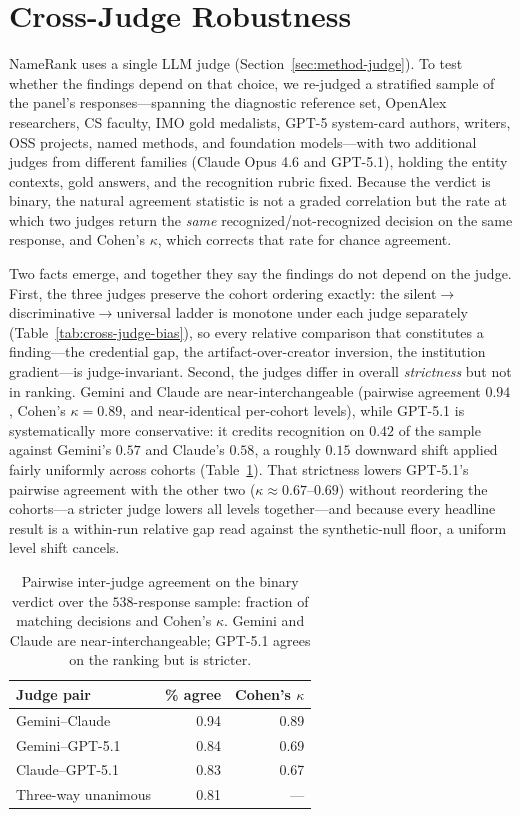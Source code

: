\section{Cross-Judge Robustness}
\label{app:cross-judge}

NameRank uses a single LLM judge (Section~\ref{sec:method-judge}). To test whether the findings depend on that choice, we re-judged a stratified sample of the panel's responses---spanning the diagnostic reference set, OpenAlex researchers, CS faculty, IMO gold medalists, GPT-5 system-card authors, writers, OSS projects, named methods, and foundation models---with two additional judges from different families (Claude Opus 4.6 and GPT-5.1), holding the entity contexts, gold answers, and the recognition rubric fixed. Because the verdict is binary, the natural agreement statistic is not a graded correlation but the rate at which two judges return the \emph{same} recognized/not-recognized decision on the same response, and Cohen's $\kappa$, which corrects that rate for chance agreement.

Two facts emerge, and together they say the findings do not depend on the judge. First, the three judges preserve the cohort ordering exactly: the silent$\to$discriminative$\to$universal ladder is monotone under each judge separately (Table~\ref{tab:cross-judge-bias}), so every relative comparison that constitutes a finding---the credential gap, the artifact-over-creator inversion, the institution gradient---is judge-invariant. Second, the judges differ in overall \emph{strictness} but not in ranking. Gemini and Claude are near-interchangeable (pairwise agreement $0.94$, Cohen's $\kappa=0.89$, and near-identical per-cohort levels), while GPT-5.1 is systematically more conservative: it credits recognition on $0.42$ of the sample against Gemini's $0.57$ and Claude's $0.58$, a roughly $0.15$ downward shift applied fairly uniformly across cohorts (Table~\ref{tab:cross-judge-corr}). That strictness lowers GPT-5.1's pairwise agreement with the other two ($\kappa \approx 0.67$--$0.69$) without reordering the cohorts---a stricter judge lowers all levels together---and because every headline result is a within-run relative gap read against the synthetic-null floor, a uniform level shift cancels.

\begin{table}[!htbp]
\centering
\small
\caption{Pairwise inter-judge agreement on the binary verdict over the $538$-response sample: fraction of matching decisions and Cohen's $\kappa$. Gemini and Claude are near-interchangeable; GPT-5.1 agrees on the ranking but is stricter.}
\label{tab:cross-judge-corr}
\begin{tabular}{lrr}
\toprule
Judge pair & \% agree & Cohen's $\kappa$ \\
\midrule
Gemini--Claude & 0.94 & 0.89 \\
Gemini--GPT-5.1 & 0.84 & 0.69 \\
Claude--GPT-5.1 & 0.83 & 0.67 \\
\midrule
Three-way unanimous & 0.81 & --- \\
\bottomrule
\end{tabular}
\end{table}

